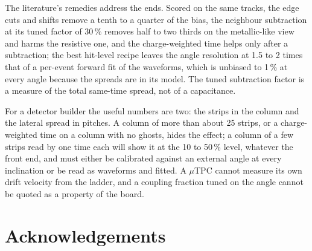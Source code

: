 The literature's remedies address the ends. Scored on the same tracks, the edge cuts and shifts remove a tenth to a quarter of the
bias, the neighbour subtraction at its tuned factor of 30\,\% removes half to two thirds on the metallic-like view and harms the
resistive one, and the charge-weighted time helps only after a subtraction; the best hit-level recipe leaves the angle
resolution at 1.5 to 2 times that of a per-event forward fit of the waveforms, which is unbiased to 1\,\% at every angle
because the spreads are in its model. The tuned subtraction factor is a measure of the total same-time spread, not of a
capacitance.

For a detector builder the useful numbers are two: the strips in the column and the lateral spread in pitches. A column of
more than about 25 strips, or a charge-weighted time on a column with no ghosts, hides the effect; a column of a few strips
read by one time each will show it at the 10 to 50\,\% level, whatever the front end, and must either be calibrated against
an external angle at every inclination or be read as waveforms and fitted. A $\mu$TPC cannot measure its own drift velocity
from the ladder, and a coupling fraction tuned on the angle cannot be quoted as a property of the board.

\section*{Acknowledgements}
